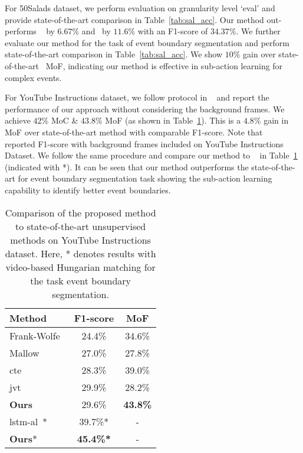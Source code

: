 \documentclass[final]{cvpr}
\begin{document}
\par For 50Salads dataset, we perform evaluation on granularity level `eval' and provide state-of-the-art comparison in Table~\ref{tab:sal_acc}. Our method out-performs ~\cite{kukleva2019unsupervised} by $6.67\%$ and~\cite{vidalmata2020joint} by $11.6\%$ with an F1-score of $34.37\%$. We further evaluate our method for the task of event boundary segmentation and perform state-of-the-art comparison in Table~\ref{tab:sal_acc}. We show $10\%$ gain over state-of-the-art~\cite{aakur2019perceptual} MoF, indicating our method is effective in sub-action learning for complex events. 

\par For YouTube Instructions dataset, we follow protocol in ~\cite{Alayrac16unsupervised, sener2018unsupervised, kukleva2019unsupervised} and report the performance of our approach without considering the background frames.
We achieve $42\%$ MoC \& $43.8\%$ MoF (as shown in Table~\ref{tab:acc_y}). 
This is a $4.8\%$ gain in MoF over state-of-the-art method with comparable F1-score. 
Note that ~\cite{aakur2019perceptual} reported F1-score with background frames included on YouTube Instructions Dataset. We follow the same procedure and compare our method to ~\cite{aakur2019perceptual} in Table~\ref{tab:acc_y} (indicated with *). It can be seen that our method outperforms the state-of-the-art for event boundary segmentation task showing the sub-action learning capability to identify better event boundaries.

\begin{table}[t]
  \caption{ {\small  Comparison of the proposed method to state-of-the-art unsupervised methods on YouTube Instructions dataset. Here, * denotes results with video-based Hungarian matching for the task event boundary segmentation. 
  } }
  \label{tab:acc_y}
  \centering
  \small
  \begin{tabular}{lcc}
    \toprule
    {\bf Method} & {\bf F1-score} & {\bf MoF}\\
    \midrule
    Frank-Wolfe~\cite{Alayrac16unsupervised} & 24.4\%  & 34.6\%   \\
   Mallow~\cite{sener2018unsupervised} & 27.0\%  & 27.8\%   \\
    {\sc cte}~\cite{kukleva2019unsupervised}    & 28.3\% & 39.0\%      \\
    {\sc jvt}~\cite{vidalmata2020joint} & 29.9\% & 28.2\% \\
    \midrule
    {\bf Ours} & 29.6\% &  \textbf{43.8\%}  \\
    \midrule
    \midrule
    {\sc lstm-al}~\cite{aakur2019perceptual}* & 39.7\%* & - \\
    {\bf Ours}* & \textbf{45.4\%*} & - \\
    \bottomrule
  \end{tabular}
\end{table}
\end{document}
